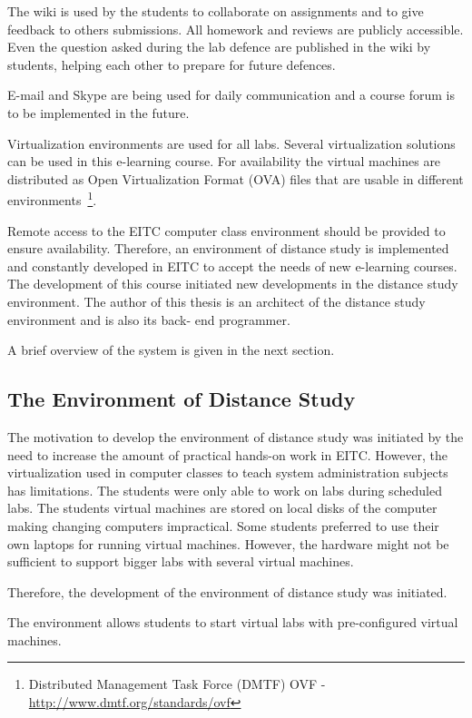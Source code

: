 The wiki is used by the students to collaborate on assignments and to give feedback to others submissions.
All homework and reviews are publicly accessible. Even the question asked during the lab defence are published in the wiki by students, helping each other to prepare for future defences.

E-mail and Skype are being used for daily communication and a course forum is to be implemented in the future. 


Virtualization environments are used for all labs. Several virtualization solutions can be used in this e-learning course. For availability the virtual machines are distributed as Open Virtualization Format (\gls{OVA}) files that are usable in different environments~\footnote{ Distributed Management Task Force (\gls{DMTF}) OVF - \url{http://www.dmtf.org/standards/ovf}}.


Remote access to the \gls{EITC} computer class environment should be provided to ensure availability.
Therefore, an environment of distance study is implemented  and constantly developed in \gls{EITC} to accept the  needs of new e-learning courses. The development of this course initiated new developments in the distance study environment.
The author of this thesis is an architect of the distance study environment and is also its back- end programmer. 

A brief overview of the system is given in the next section.

\subsection{The Environment of Distance Study}
\label{The Environment of Distance Study}
The motivation to develop the environment of distance study was initiated by the need to increase the amount of practical hands-on work in \gls{EITC}. However, the virtualization used in computer classes to teach system administration subjects has limitations. The students were only able to work on labs during scheduled labs.
The students virtual machines are stored on local disks of the computer making changing computers impractical. Some students preferred to use their own laptops for running virtual machines. However, the hardware might not be sufficient to support bigger labs with several virtual machines.

Therefore, the development of the environment of distance study was initiated.

The environment allows students to start virtual labs with pre-configured virtual machines.
 
